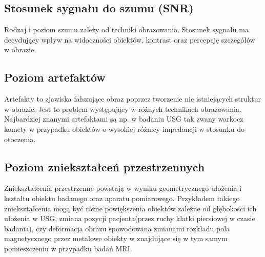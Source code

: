 \subsection{Stosunek sygnału do szumu (SNR)}

Rodzaj i poziom szumu zależy od techniki obrazowania.
Stosunek sygnału ma decydujący wpływ na widoczności obiektów, kontrast oraz percepcję szczegółów w obrazie.

\subsection{Poziom artefaktów}

Artefakty to zjawiska fałszujące obraz poprzez tworzenie nie istniejących struktur w obrazie.
Jest to problem występujący w różnych technikach obrazowania.
Najbardziej znanymi artefaktami są np. w badaniu USG tak zwany warkocz komety w przypadku obiektów o wysokiej różnicy impedancji w stosunku do otoczenia.

\subsection{Poziom zniekształceń przestrzennych}

Zniekształcenia przestrzenne powstają w wyniku geometrycznego ułożenia i kształtu obiektu badanego oraz aparatu pomiarowego.
Przykładem takiego zniekształcenia mogą być różne powiększenia obiektów zależne od głębokości ich ułożenia w USG, zmiana pozycji pacjenta(przez ruchy klatki piersiowej w czasie badania), czy deformacja obrazu spowodowana zmianami rozkładu pola magnetycznego przez metalowe obiekty w znajdujące się w tym samym pomieszczeniu w przypadku badań MRI.

